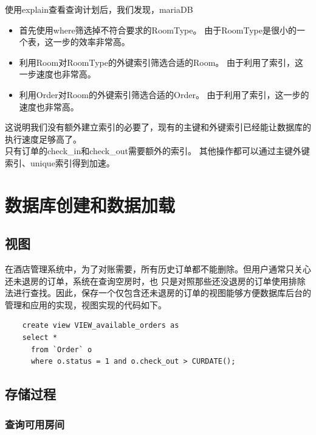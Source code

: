 \documentclass{myreport}
\begin{document}
使用explain查看查询计划后，我们发现，mariaDB
\begin{itemize}
    \item 首先使用where筛选掉不符合要求的RoomType。
    由于RoomType是很小的一个表，这一步的效率非常高。
    \item 利用Room对RoomType的外键索引筛选合适的Room。
    由于利用了索引，这一步速度也非常高。
    \item 利用Order对Room的外键索引筛选合适的Order。
    由于利用了索引，这一步的速度也非常高。
\end{itemize}
  
这说明我们没有额外建立索引的必要了，现有的主键和外键索引已经能让数据库的执行速度足够高了。\\


只有订单的check\_in和check\_out需要额外的索引。
其他操作都可以通过主键外键索引、unique索引得到加速。


\chapter{数据库创建和数据加载}
\section{视图}
在酒店管理系统中，为了对账需要，所有历史订单都不能删除。但用户通常只关心还未退房的订单，系统在查询空房时，也
只是对照那些还没退房的订单使用排除法进行查找。因此，保存一个仅包含还未退房的订单的视图能够方便数据库后台的管理和应用的实现，视图实现的代码如下。

\begin{verbatim}
    create view VIEW_available_orders as
    select *
      from `Order` o
      where o.status = 1 and o.check_out > CURDATE();
\end{verbatim}


\section{存储过程}

\label{procedure}

\subsection{查询可用房间}
\end{document}
